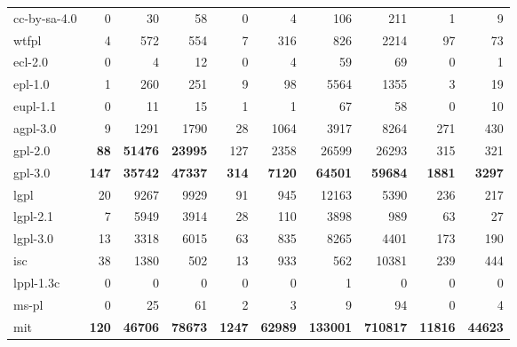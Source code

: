 {\begin{tabular}{@{}l r r r r r r r r r@{}}
cc-by-sa-4.0       &     0   &     30     &     58     &     0    &     4     &     106    &     211        &     1     &     9          \\
wtfpl              &     4   &     572    &     554    &     7    &     316   &     826    &     2214       &     97    &     73         \\
ecl-2.0            &     0   &     4      &     12     &     0    &     4     &     59     &     69         &     0     &     1          \\
epl-1.0            &     1   &     260    &     251    &     9    &     98    &     5564   &     1355       &     3     &     19         \\
eupl-1.1           &     0   &     11     &     15     &     1    &     1     &     67     &     58         &     0     &     10         \\
agpl-3.0           &     9   &     1291   &     1790   &     28   &     1064  &     3917   &     8264       &     271   &     430        \\
gpl-2.0            & \bf 88  & \bf 51476  & \bf 23995  &     127  &     2358  &     26599  &     26293      &     315   &     321        \\
gpl-3.0            & \bf 147 & \bf 35742  & \bf 47337  & \bf 314  & \bf 7120  & \bf 64501  & \bf 59684      & \bf 1881  & \bf 3297       \\
lgpl               &     20  &     9267   &     9929   &     91   &     945   &     12163  &     5390       &     236   &     217        \\
lgpl-2.1           &     7   &     5949   &     3914   &     28   &     110   &     3898   &     989        &     63    &     27         \\
lgpl-3.0           &     13  &     3318   &     6015   &     63   &     835   &     8265   &     4401       &     173   &     190        \\
isc                &     38  &     1380   &     502    &     13   &     933   &     562    &     10381      &     239   &     444        \\
lppl-1.3c          &     0   &     0      &     0      &     0    &     0     &     1      &     0          &     0     &     0          \\
ms-pl              &     0   &     25     &     61     &     2    &     3     &     9      &     94         &     0     &     4          \\
mit                & \bf 120 & \bf 46706  & \bf 78673  & \bf 1247 & \bf 62989 & \bf 133001 & \bf 710817     & \bf 11816 & \bf 44623      \\

\end{tabular}}
